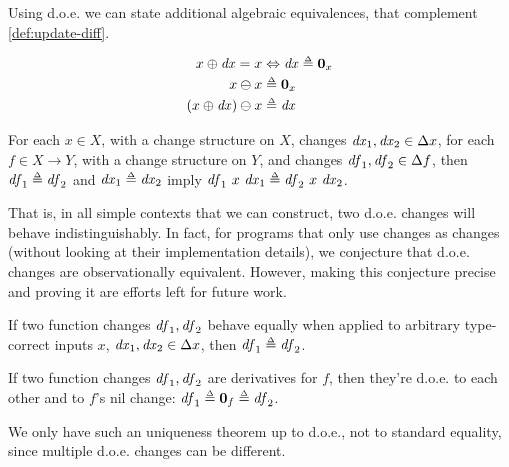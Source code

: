 \begin{lemma}
  Using d.o.e. we can state additional algebraic equivalences,
  that complement \cref{def:update-diff}.

\begin{align*}
\Update x \D{x} = x &\Leftrightarrow \D{x} \Doe \Nil{x}\\
\Diff x x &\Doe \Nil {x}\\
\Diff {\Update*{x}{\D{x}}} x &\Doe \D{x}
\end{align*}
\end{lemma}

\begin{lemma}
  For each $x \in X$, with a change structure on $X$, changes
  $\D{x}_1, \D{x}_2 \in \Change{x}$, for each $f \in X \to Y$,
with a change structure on $Y$, and changes
$\D{f}_1, \D{f}_2 \in \Change{f}$, then $\D{f}_1 \Doe \D{f}_2$ and
$\D{x}_1 \Doe \D{x}_2$ imply
$\D{f}_1~x~\D{x}_1 \Doe \D{f}_2~x~\D{x}_2$.
\end{lemma}

That is, in all simple contexts that we can construct, two d.o.e.
changes will behave indistinguishably. In fact, for programs that
only use changes as changes (without looking at their
implementation details), we conjecture that d.o.e. changes are
observationally equivalent. However, making this conjecture
precise and proving it are efforts left for future work.

\begin{lemma}
  If two function changes $\mathit{df}_1, \mathit{df}_2$ behave equally when
  applied to arbitrary type-correct inputs $x$,
  $\D{x}_1, \D{x}_2 \in \Change{x}$, then $\D{f}_1 \Doe \D{f}_2$.
\end{lemma}

\begin{lemma}
  If two function changes $\mathit{df}_1, \mathit{df}_2$ are derivatives for
  $f$, then they're d.o.e. to each other and to $f$'s nil change:
  $\D{f}_1 \Doe \Nil{f} \Doe \D{f}_2$.
\end{lemma}
We only have such an uniqueness theorem up to d.o.e., not to
standard equality, since multiple d.o.e. changes can be
different.
